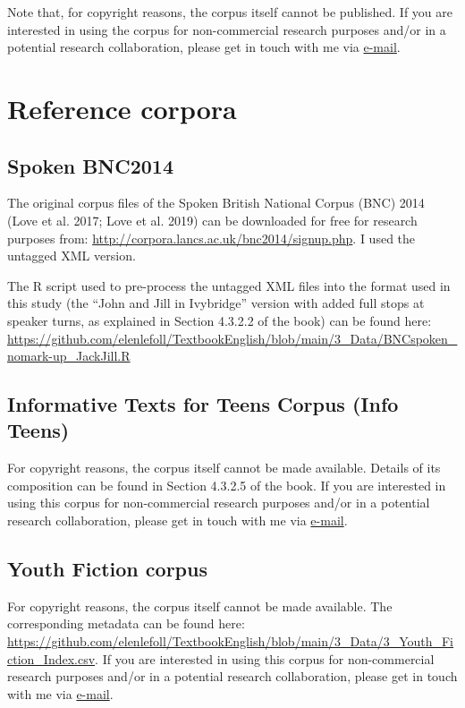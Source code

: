 \documentclass[
  letterpaper,
  DIV=11,
  numbers=noendperiod]{scrreprt}
\begin{document}
Note that, for copyright reasons, the corpus itself cannot be published.
If you are interested in using the corpus for non-commercial research
purposes and/or in a potential research collaboration, please get in
touch with me via \href{https://orcid.org/0000-0002-5839-8010}{e-mail}.

\section{Reference corpora}\label{reference-corpora}

\subsection{Spoken BNC2014}\label{spoken-bnc2014}

The original corpus files of the Spoken British National Corpus (BNC)
2014 (Love et al. 2017; Love et al. 2019) can be downloaded for free for
research purposes from:
\url{http://corpora.lancs.ac.uk/bnc2014/signup.php}. I used the untagged
XML version.

The R script used to pre-process the untagged XML files into the format
used in this study (the ``John and Jill in Ivybridge'' version with
added full stops at speaker turns, as explained in Section 4.3.2.2 of
the book) can be found here:
\url{https://github.com/elenlefoll/TextbookEnglish/blob/main/3_Data/BNCspoken_nomark-up_JackJill.R}

\subsection{Informative Texts for Teens Corpus (Info
Teens)}\label{informative-texts-for-teens-corpus-info-teens}

For copyright reasons, the corpus itself cannot be made available.
Details of its composition can be found in Section 4.3.2.5 of the book.
If you are interested in using this corpus for non-commercial research
purposes and/or in a potential research collaboration, please get in
touch with me via \href{https://orcid.org/0000-0002-5839-8010}{e-mail}.

\subsection{Youth Fiction corpus}\label{youth-fiction-corpus}

For copyright reasons, the corpus itself cannot be made available. The
corresponding metadata can be found here:
\url{https://github.com/elenlefoll/TextbookEnglish/blob/main/3_Data/3_Youth_Fiction_Index.csv}.
If you are interested in using this corpus for non-commercial research
purposes and/or in a potential research collaboration, please get in
touch with me via \href{https://orcid.org/0000-0002-5839-8010}{e-mail}.
\end{document}
